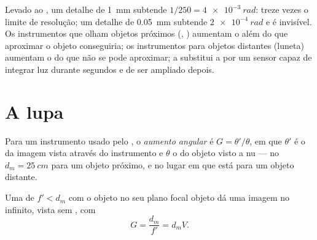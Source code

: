 \begin{remark}\label{rem:b1:optical-instruments:purpose}
Levado ao , um detalhe de \qty{1}{mm} subtende $1/250 =
\qty{4e-3}{rad}$: treze vezes o limite de resolução; um detalhe de \qty{0.05}{mm}
subtende $\qty{2e-4}{rad}$ e é invisível. Os instrumentos que
olham objetos próximos (, ) aumentam o 
além do que aproximar o objeto conseguiria; os instrumentos para objetos
distantes (luneta) aumentam o  do que não se pode
aproximar; a  substitui a  por um sensor capaz de integrar
luz durante segundos e de ser ampliado depois.
\end{remark}

\section{A lupa}

\begin{definition}\label{def:b1:optical-instruments:G}
Para um instrumento usado pelo , o \emph{aumento angular} é
$G = \theta'/\theta$, em que $\theta'$ é o  da imagem
vista através do instrumento e $\theta$ o  do objeto
visto a  nu --- no  $d_m = \qty{25}{cm}$ para
um objeto próximo, e no lugar em que está para um objeto distante.
\end{definition}

\begin{proposition}[A lupa]\label{prop:b1:optical-instruments:loupe}
Uma  de  $f' < d_m$ com o objeto no seu
plano focal objeto dá uma imagem no infinito, vista sem
, com
\[
G = \frac{d_m}{f'} = d_m V .
\]
\end{proposition}

